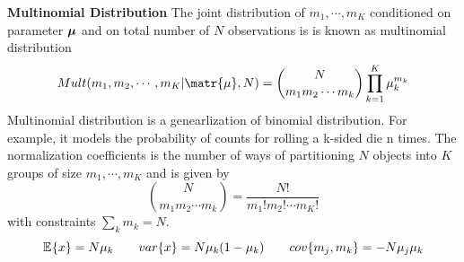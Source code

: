 \documentclass[11pt]{article}
\begin{document}
\begin{defn*}
    \textbf{Multinomial Distribution} The joint distribution of $m_1,\cdots, m_K$ conditioned on parameter $\boldsymbol{\mu}$ and on total number of $N$ observations is is known as multinomial distribution 
    \[
        Mult(m_1,m_2,\cdots, m_K | \matr{\mu}, N) = 
        \binom{N}{m_1 m_2 \cdots m_k} \prod_{k=1}^K \mu_k^{m_k}
    \]
    Multinomial distribution is a genearlization of binomial distribution. For example, it models the probability of counts for rolling a k-sided die n times. The normalization coefficients is the number of ways of partitioning $N$ objects into $K$ groups of size $m_1,\cdots, m_K$ and is given by 
    \[
        \binom{N}{m_1 m_2 \cdots m_k} = \frac{N!}{m_1!m_2!\cdots m_K!}
    \]
    with constraints $\textstyle \sum_k m_k = N$. 
    \[
        \mathbb{E}_{}\{x\} = N \mu_k 
        \quad\quad 
        var\{x\} = N\mu_k (1-\mu_k)    
        \quad\quad 
        cov\{m_j, m_k\} = -N \mu_j \mu_k
    \]
\end{defn*} 
\end{document}
